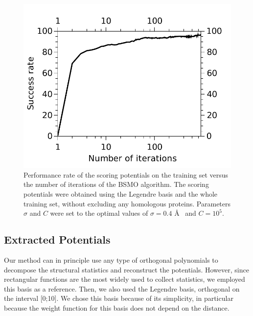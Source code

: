 \begin{figure}[H]
\begin{center}
\includegraphics[scale=0.8]{Scoring/Fig/SuccessRateVsNIter}
\caption[Performance rate of the scoring potentials on the training set versus the number of iterations of the BSMO algorithm]{
Performance rate of the scoring potentials on the training set versus the number of iterations of the BSMO algorithm. The scoring potentials were obtained using the Legendre basis and the whole
training set, without excluding any homologous proteins. Parameters $\sigma$ and $C$ were set to the optimal values of $\sigma=0.4$ \AA~ and $C=10^5$.
}
\label{fig:convergence} 
\end{center}
\end{figure}


\subsection{Extracted Potentials}
Our method can in principle use any type of orthogonal polynomials to decompose the structural statistics and reconstruct the potentials. 
However, since rectangular functions are the most widely used to collect  statistics, we employed this basis as a reference. 
Then, we also used the Legendre basis, orthogonal on the interval [0;10]. We chose this basis because of its simplicity, in particular because 
the weight function for this basis does not depend on the distance.
%

